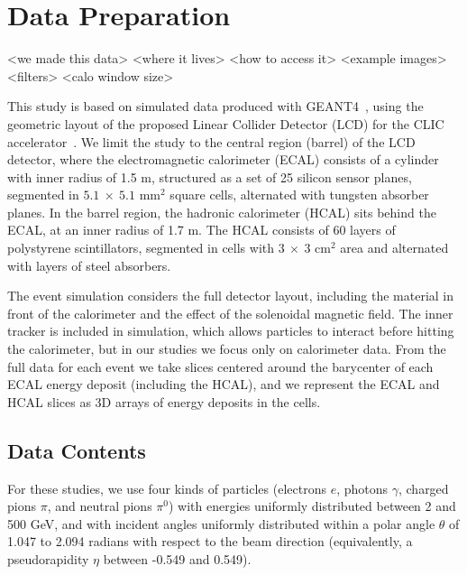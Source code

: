\chapter{Data Preparation}\label{sec:data}

<we made this data>
<where it lives>
<how to access it>
<example images>
<filters>
<calo window size>

This study is based on simulated data produced with GEANT4~\cite{GEANT4}, using the geometric layout of the proposed Linear Collider Detector (LCD) for the CLIC accelerator~\cite{Lebrun:2012hj}. We limit the study to the central region (barrel) of the LCD detector, where the electromagnetic calorimeter (ECAL) consists of a cylinder with inner radius of 1.5 m, structured as a set of 25 silicon sensor planes, segmented in $5.1~\times~5.1$ mm$^2$ square cells, alternated with tungsten absorber planes. In the barrel region, the hadronic calorimeter (HCAL) sits behind the ECAL, at an inner radius of 1.7 m. The HCAL 
consists of 60 layers of polystyrene scintillators, segmented in cells with  $3~\times~3$ cm$^2$ area and alternated with layers of steel absorbers. 

The event simulation considers the full detector layout, including the material in front of the calorimeter and the effect of the solenoidal magnetic field. The inner tracker is included in simulation, which allows particles to interact before hitting the calorimeter, but in our studies we focus only on calorimeter data. From the full data for each event we take slices centered around the barycenter of each ECAL energy deposit (including the HCAL), and we represent the ECAL and HCAL slices as 3D arrays of energy deposits in the cells.

\section{Data Contents}

For these studies, we use four kinds of particles (electrons $e$, photons $\gamma$, charged pions $\pi$, and neutral pions $\pi^0$) with energies uniformly distributed between 2 and 500 GeV, and with incident angles uniformly distributed within a polar angle $\theta$ of 1.047 to 2.094 radians with respect to the beam direction (equivalently, a pseudorapidity $\eta$ between -0.549 and 0.549).

